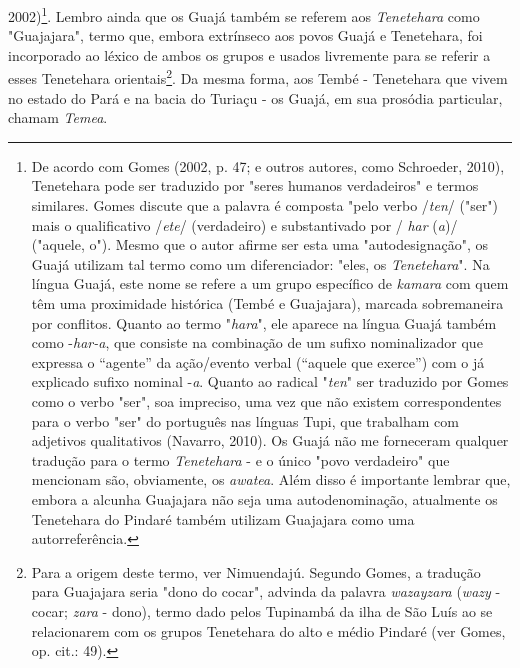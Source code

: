 2002)\footnote{De acordo com Gomes (2002, p. 47; e outros autores, como
  Schroeder, 2010), Tenetehara pode ser traduzido por "seres humanos
  verdadeiros" e termos similares. Gomes discute que a palavra é
  composta "pelo verbo /\emph{ten}/ ("ser") mais o qualificativo
  /\emph{ete}/ (verdadeiro) e substantivado por / \emph{har} (\emph{a})/
  ("aquele, o"). Mesmo que o autor afirme ser esta uma "autodesignação",
  os Guajá utilizam tal termo como um diferenciador: "eles, os
  \emph{Tenetehara}". Na língua Guajá, este nome se refere a um grupo
  específico de \emph{kamara} com quem têm uma proximidade histórica
  (Tembé e Guajajara), marcada sobremaneira por conflitos. Quanto ao
  termo "\emph{hara}", ele aparece na língua Guajá também como
  -\emph{har-a}, que consiste na combinação de um sufixo nominalizador
  que expressa o ``agente'' da ação/evento verbal (``aquele que
  exerce'') com o já explicado sufixo nominal -\emph{a}. Quanto ao
  radical "\emph{ten}" ser traduzido por Gomes como o verbo "ser", soa
  impreciso, uma vez que não existem correspondentes para o verbo "ser"
  do português nas línguas Tupi, que trabalham com adjetivos
  qualitativos (Navarro, 2010). Os Guajá não me forneceram qualquer
  tradução para o termo \emph{Tenetehara} - e o único "povo verdadeiro"
  que mencionam são, obviamente, os \emph{awatea}. Além disso é
  importante lembrar que, embora a alcunha Guajajara não seja uma
  autodenominação, atualmente os Tenetehara do Pindaré também utilizam
  Guajajara como uma autorreferência.}. Lembro ainda que os Guajá também
se referem aos \emph{Tenetehara} como "Guajajara", termo que, embora
extrínseco aos povos Guajá e Tenetehara, foi incorporado ao léxico de
ambos os grupos e usados livremente para se referir a esses Tenetehara
orientais\footnote{Para a origem deste termo, ver Nimuendajú. Segundo
  Gomes, a tradução para Guajajara seria "dono do cocar", advinda da
  palavra \emph{wazayzara} (\emph{wazy} - cocar; \emph{zara} - dono),
  termo dado pelos Tupinambá da ilha de São Luís ao se relacionarem com
  os grupos Tenetehara do alto e médio Pindaré (ver Gomes, op. cit.:
  49).}. Da mesma forma, aos Tembé - Tenetehara que vivem no estado do
Pará e na bacia do Turiaçu - os Guajá, em sua prosódia particular,
chamam \emph{Temea}.

